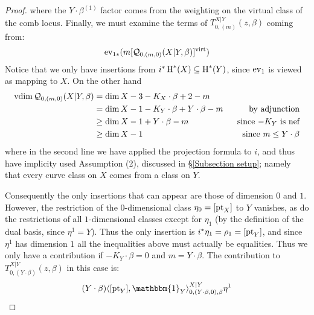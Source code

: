 \begin{proof}
where the $Y \cdot \beta^{(1)}$ factor comes from the weighting on the virtual class of the comb locus. Finally, we must examine the terms of $T_{0,(m)}^{X|Y}(z,\beta)$ coming from:
\begin{equation*}\operatorname{ev}_{1*}(m[\mathcal{Q}_{0,(m,0)}(X|Y,\beta)]^{\operatorname{virt}})\end{equation*} 
Notice that we only have insertions from $i^*\operatorname{H}^*(X) \subseteq \operatorname{H}^*(Y)$, since $\operatorname{ev}_1$ is viewed as mapping to $X$. On the other hand
\begin{align*} \operatorname{vdim} \mathcal{Q}_{0,(m,0)}(X|Y,\beta) & = \dim X-3 -K_X \cdot \beta +2-m & \\
& = \dim X - 1 -K_Y \cdot \beta + Y \cdot \beta - m \ \ & \text{by adjunction} \\
& \geq \dim X - 1 + Y\cdot\beta - m \ \ & \text{since $-K_Y$ is nef} \\
& \geq \dim X - 1 \ \ & \text{since $m \leq Y \cdot \beta$} \end{align*}
where in the second line we have applied the projection formula to $i$, and thus have implicity used Assumption (2), discussed in \S \ref{Subsection setup}; namely that every curve class on $X$ comes from a class on $Y$.

Consequently the only insertions that can appear are those of dimension $0$ and $1$. However, the restriction of the $0$-dimensional class $\eta_0 = [\operatorname{pt}_X]$ to $Y$ vanishes, as do the restrictions of all $1$-dimensional classes except for $\eta_1$ (by the definition of the dual basis, since $\eta^1 = Y$). Thus the only insertion is $i^*\eta_1=\rho_1=[\operatorname{pt}_Y]$, and since $\eta^1$ has dimension $1$ all the inequalities above must actually be equalities. Thus we only have a contribution if $-K_Y \cdot \beta = 0$ and $m = Y \cdot \beta$. The contribution to $T_{0,(Y\cdot\beta)}^{X|Y}(z,\beta)$ in this case is:
\begin{equation*} (Y \cdot \beta) \langle [\pt_Y] , \mathbbm{1}_Y \rangle_{0,(Y \cdot \beta,0),\beta}^{X|Y} \eta^1 \end{equation*}


\end{proof}
